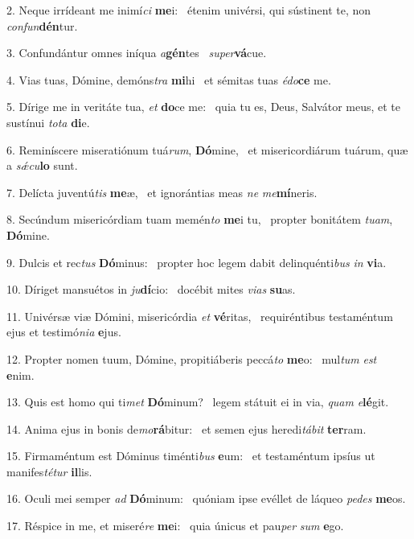 2. Neque irrídeant me inimí\textit{ci} \textbf{me}i: \ast\  étenim univérsi, qui sústinent te, non \textit{con}\textit{fun}\textbf{dén}tur.\

3. Confundántur omnes iníqua \textit{a}\textbf{gén}tes \ast\  \textit{su}\textit{per}\textbf{vá}cue.\

4. Vias tuas, Dómine, demóns\textit{tra} \textbf{mi}hi \ast\  et sémitas tuas \textit{é}\textit{do}\textbf{ce} me.\

5. Dírige me in veritáte tua, \textit{et} \textbf{do}ce me: \ast\  quia tu es, Deus, Salvátor meus, et te sustínui \textit{to}\textit{ta} \textbf{di}e.\

6. Reminíscere miseratiónum tuá\textit{rum}, \textbf{Dó}mine, \ast\  et misericordiárum tuárum, quæ a \textit{sǽ}\textit{cu}\textbf{lo} sunt.\

7. Delícta juventú\textit{tis} \textbf{me}æ, \ast\  et ignorántias meas \textit{ne} \textit{me}\textbf{mí}neris.\

8. Secúndum misericórdiam tuam memén\textit{to} \textbf{me}i tu, \ast\  propter bonitátem \textit{tu}\textit{am}, \textbf{Dó}mine.\

9. Dulcis et rec\textit{tus} \textbf{Dó}minus: \ast\  propter hoc legem dabit delinquénti\textit{bus} \textit{in} \textbf{vi}a.\

10. Díriget mansuétos in \textit{ju}\textbf{dí}cio: \ast\  docébit mites \textit{vi}\textit{as} \textbf{su}as.\

11. Univérsæ viæ Dómini, misericórdia \textit{et} \textbf{vé}ritas, \ast\  requiréntibus testaméntum ejus et testimó\textit{ni}\textit{a} \textbf{e}jus.\

12. Propter nomen tuum, Dómine, propitiáberis peccá\textit{to} \textbf{me}o: \ast\  mul\textit{tum} \textit{est} \textbf{e}nim.\

13. Quis est homo qui ti\textit{met} \textbf{Dó}minum? \ast\  legem státuit ei in via, \textit{quam} \textit{e}\textbf{lé}git.\

14. Anima ejus in bonis de\textit{mo}\textbf{rá}bitur: \ast\  et semen ejus heredi\textit{tá}\textit{bit} \textbf{ter}ram.\

15. Firmaméntum est Dóminus timénti\textit{bus} \textbf{e}um: \ast\  et testaméntum ipsíus ut manifes\textit{té}\textit{tur} \textbf{il}lis.\

16. Oculi mei semper \textit{ad} \textbf{Dó}minum: \ast\  quóniam ipse evéllet de láqueo \textit{pe}\textit{des} \textbf{me}os.\

17. Réspice in me, et miseré\textit{re} \textbf{me}i: \ast\  quia únicus et pau\textit{per} \textit{sum} \textbf{e}go.\

